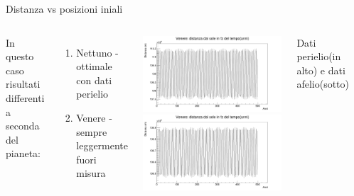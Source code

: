         \begin{frame}{Distanza vs posizioni iniali}
            \begin{columns}
                    In questo caso risultati differenti a seconda del pianeta:
                    \begin{enumerate}
                        \item Nettuno - ottimale con dati perielio
                        \item Venere - sempre leggermente fuori misura
                    \end{enumerate}
                    \centering
                    \includegraphics[width=\textwidth]{5_distanza/Ven_peri_500.jpg}
                    \includegraphics[width=\textwidth]{5_distanza/Ven_afe_500.jpg}
                    \caption{Dati perielio(in alto) e dati afelio(sotto)}
                    \label{cfr::ven} 
            \end{columns}
        \end{frame}
